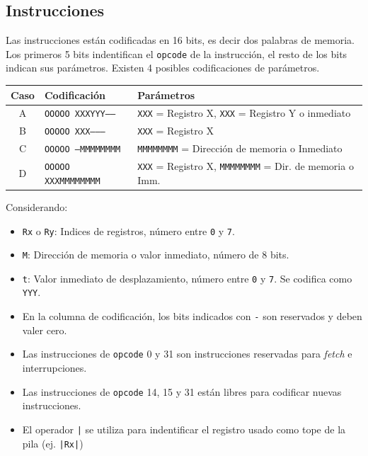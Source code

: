 \documentclass[a4paper,11pt]{article}
\begin{document}
\subsection*{Instrucciones}

Las instrucciones están codificadas en 16 bits, es decir dos palabras de memoria.
Los primeros 5 bits indentifican el \texttt{opcode} de la instrucción, el resto de los bits indican sus parámetros.
Existen 4 posibles codificaciones de parámetros.

\begin{center}
\begin{tabular}{c|l|l}
Caso & Codificación               & Parámetros \\
\hline
A    & \texttt{OOOOO XXXYYY-----} & \texttt{XXX} = Registro X, \texttt{XXX} = Registro Y o inmediato \\
B    & \texttt{OOOOO XXX--------} & \texttt{XXX} = Registro X\\
C    & \texttt{OOOOO ---MMMMMMMM} & \texttt{MMMMMMMM} = Dirección de memoria o Inmediato\\
D    & \texttt{OOOOO XXXMMMMMMMM} & \texttt{XXX} = Registro X, \texttt{MMMMMMMM} = Dir. de memoria o Imm.\\
\end{tabular}
\end{center}

\noindent Considerando:

\small
\begin{itemize}
 \setlength\itemsep{0em}
 \item \texttt{Rx} o \texttt{Ry}: Indices de registros, número entre \texttt{0} y \texttt{7}.
 \item \texttt{M}: Dirección de memoria o valor inmediato, número de 8 bits.
 \item \texttt{t}: Valor inmediato de desplazamiento, número entre \texttt{0} y \texttt{7}. Se codifica como \texttt{YYY}.
 \item En la columna de codificación, los bits indicados con \texttt{-} son reservados y deben valer cero.
 \item Las instrucciones de \texttt{opcode} 0 y 31 son instrucciones reservadas para \emph{fetch} e interrupciones.
 \item Las instrucciones de \texttt{opcode} 14, 15 y 31 están libres para codificar nuevas instrucciones.
 \item El operador \texttt{|} se utiliza para indentificar el registro usado como tope de la pila (ej. \texttt{|Rx|})
\end{itemize}
\normalsize
\end{document}
